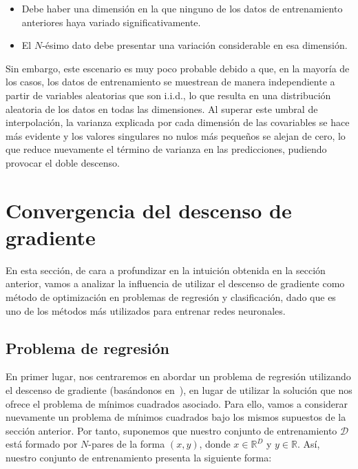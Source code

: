 \begin{itemize}
    \item Debe haber una dimensión en la que ninguno de los datos de entrenamiento anteriores haya variado significativamente.
    \item El $N$-ésimo dato debe presentar una variación considerable en esa dimensión.\newline
\end{itemize}

Sin embargo, este escenario es muy poco probable debido a que, en la mayoría de los casos, los datos de entrenamiento se muestrean de manera independiente a partir de variables aleatorias que son i.i.d., lo que resulta en una distribución aleatoria de los datos en todas las dimensiones. Al superar este umbral de interpolación, la varianza explicada por cada dimensión de las covariables se hace más evidente y los valores singulares no nulos más pequeños se alejan de cero, lo que reduce nuevamente el término de varianza en las predicciones, pudiendo provocar el doble descenso.\newline

\section{Convergencia del descenso de gradiente}\label{sec:sesgo-implicito-descenso-gradiente}

En esta sección, de cara a profundizar en la intuición obtenida en la sección anterior, vamos a analizar la influencia de utilizar el descenso de gradiente como método de optimización en problemas de regresión y clasificación, dado que es uno de los métodos más utilizados para entrenar redes neuronales.\newline

\subsection{Problema de regresión}\label{subsec:problema-regresion}
En primer lugar, nos centraremos en abordar un problema de regresión utilizando el descenso de gradiente (basándonos en~\cite{Lafon2024}), en lugar de utilizar la solución que nos ofrece el problema de mínimos cuadrados asociado. Para ello, vamos a considerar nuevamente un problema de mínimos cuadrados bajo los mismos supuestos de la sección anterior. Por tanto, suponemos que nuestro conjunto de entrenamiento $\mathcal{D}$ está formado por $N$-pares de la forma $(x, y)$, donde $x \in \mathbb{R}^{D}$ y $y \in \mathbb{R}$. Así, nuestro conjunto de entrenamiento presenta la siguiente forma:


